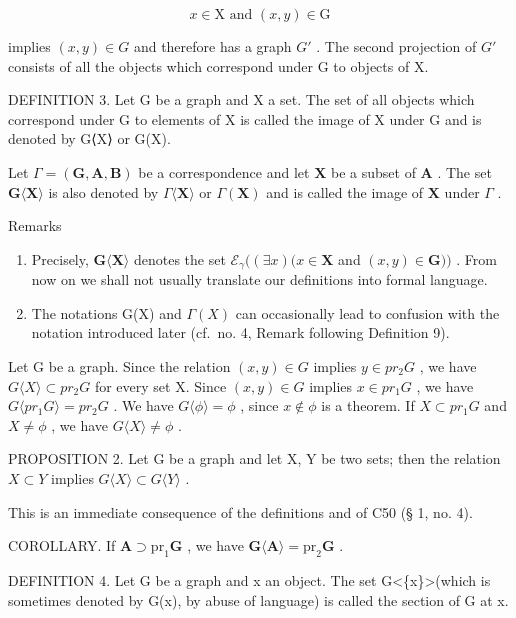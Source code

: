 \[
x \in \mathrm{X} \text {   and   } (x, y) \in \mathrm{G}
\]

implies \((x, y) \in G\) and therefore has a graph \(G'\) . The second projection of \(G'\) consists of all the objects which correspond under G to objects of X.

DEFINITION 3. Let G be a graph and X a set. The set of all objects which correspond under G to elements of X is called the image of X under G and is denoted by G⟨X⟩ or G(X).

Let \(\Gamma = (\mathbf{G},\mathbf{A},\mathbf{B})\) be a correspondence and let \(\mathbf{X}\) be a subset of \(\mathbf{A}\) . The set \(\mathbf{G}\langle \mathbf{X}\rangle\) is also denoted by \(\Gamma \langle \mathbf{X}\rangle\) or \(\Gamma (\mathbf{X})\) and is called the image of \(\mathbf{X}\) under \(\Gamma\) .

Remarks

\begin{enumerate}
\def\labelenumi{(\arabic{enumi})}
\item
  Precisely, \(\mathbf{G}\langle \mathbf{X}\rangle\) denotes the set \(\mathcal{E}_{\gamma}((\exists x)(x\in \mathbf{X}\) and \((x,y)\in \mathbf{G}))\) . From now on we shall not usually translate our definitions into formal language.
\item
  The notations G(X) and \(\Gamma(X)\) can occasionally lead to confusion with the notation introduced later (cf.~no. 4, Remark following Definition 9).
\end{enumerate}

Let G be a graph. Since the relation \((x, y) \in G\) implies \(y \in pr_{2}G\) , we have \(G\langle X \rangle \subset pr_{2}G\) for every set X. Since \((x, y) \in G\) implies \(x \in pr_{1}G\) , we have \(G\langle pr_{1}G \rangle = pr_{2}G\) . We have \(G\langle \phi \rangle = \phi\) , since \(x \notin \phi\) is a theorem. If \(X \subset pr_{1}G\) and \(X \neq \phi\) , we have \(G\langle X \rangle \neq \phi\) .

PROPOSITION 2. Let G be a graph and let X, Y be two sets; then the relation \(X \subset Y\) implies \(G\langle X\rangle \subset G\langle Y\rangle\) .

This is an immediate consequence of the definitions and of C50 (§ 1, no. 4).

COROLLARY. If \(\mathbf{A} \supset \mathrm{pr}_1\mathbf{G}\) , we have \(\mathbf{G}\langle \mathbf{A} \rangle = \mathrm{pr}_2\mathbf{G}\) .

DEFINITION 4. Let G be a graph and x an object. The set G\textless\{x\}\textgreater(which is sometimes denoted by G(x), by abuse of language) is called the section of G at x.


